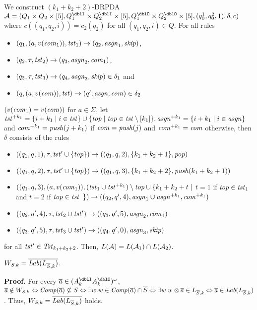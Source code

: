 We construct $(k_1+k_2+2)$-DRPDA
$\calA=(Q_1\times Q_2\times[5], Q^\dblI_1\times Q^\dblI_2\times[5], Q^\dblO_1\times Q^\dblO_2\times[5], (q^1_0, q^2_0, 1), \delta, c)$
where $c((q_1,q_2,i))=c_2(q_2)$ for all $(q_1,q_2,i)\in Q$.
For all rules
\begin{itemize}
\item $(q_1, (a,v(\mathit{com}_1)), \mathit{tst}_1)\to(q_2,\mathit{asgn}_1, \mathit{skip})$,
\item $(q_2, \tau, \mathit{tst}_2)\to(q_3,\mathit{asgn}_2, \mathit{com}_1)$,
\item $(q_3, \tau, \mathit{tst}_3)\to(q_4,\mathit{asgn}_3, \mathit{skip})\in\delta_1$ and
\item $(q, (a,v(\mathit{com})), \mathit{tst})\to(q',\mathit{asgn}, \mathit{com})\in\delta_2$
\end{itemize}
$(v(\mathit{com}_1)=v(\mathit{com}))$ for $a\in\Sigma$,
let $\mathit{tst}^{+ k_1}=\{i+k_1\mid i\in\mathit{tst}\}\cup\{\mathit{top}\mid\mathit{top}\in\mathit{tst}\setminus[k_1]\}, \mathit{asgn}^{+ k_1}=\{i+k_1\mid i\in\mathit{asgn}\}$ and $\mathit{com}^{+ k_1} = \mathit{push}(j+k_1)$ if $\mathit{com}=\mathit{push}(j)$ and $\mathit{com}^{+ k_1} = \mathit{com}$ otherwise, then $\delta$ consists of the rules
\begin{itemize}
\item $((q_1, q, 1), \tau, \mathit{tst}'\cup\{\mathit{top}\})\to((q_1, q, 2), \{k_1+k_2+1\}, \mathit{pop})$
\item $((q_1, q, 2), \tau, \mathit{tst}'\cup\{\mathit{top}\})\to((q_1, q, 3), \{k_1+k_2+2\}, \mathit{push}(k_1+k_2+1))$
\item $((q_1, q, 3), (a,v(\mathit{com}_1)), (\mathit{tst}_1\cup\mathit{tst}^{+ k_1})\setminus\mathit{top}\cup\{k_1+k_2+t\mid$ $t=1$ if $\mathit{top}\in\mathit{tst}_1$ and $t=2$ if $\mathit{top}\in\mathit{tst}$ $\})\to((q_2, q', 4), \mathit{asgn}_1\cup\mathit{asgn}^{+ k_1}, \mathit{com}^{+ k_1})$
\item $((q_2, q', 4), \tau, \mathit{tst}_2\cup\mathit{tst}')\to((q_3, q', 5), \mathit{asgn}_2, \mathit{com}_1)$
\item $((q_3, q', 5), \tau, \mathit{tst}_3\cup\mathit{tst}')\to((q_4, q', 0), \mathit{asgn}_3, \mathit{skip})$
\end{itemize}
for all $\mathit{tst}'\in\mathit{Tst}_{k_1+k_2+2}$.
Then, $L({\cal A})=L({\cal A}_1)\cap L({\cal A}_2)$.

\begin{lemma}  \label{lem: W=lab}
$W_{S,k} = \overline{\mathit{Lab}(L_{{\overline{S}},k})}$.
\end{lemma}
{\bf Proof.}\quad
For every $\overa\in(A_k^\dblI A_k^\dblO)^\omega$,
${\overline{a}}\notin W_{S,k} \Leftrightarrow {\mathit{Comp}}({\overline{a}})\not\subseteq S
\Leftrightarrow \exists w. w\in {\mathit{Comp}}({\overline{a}})\cap {\overline{S}}
\Leftrightarrow \exists w. w\otimes{\overline{a}}\in L_{{\overline{S}},k}
\Leftrightarrow {\overline{a}}\in\mathit{Lab}(L_{{\overline{S}},k})$.
Thus, $W_{S,k} = \overline{\mathit{Lab}(L_{{\overline{S}},k})}$ holds.

